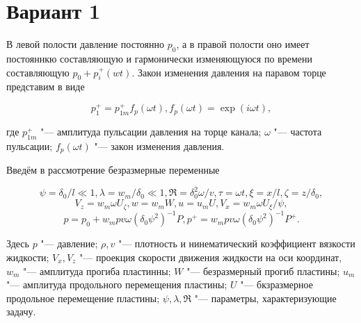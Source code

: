 \section*{Вариант 1}
    
    
    В левой полости давление постоянно $p_0$,
    а в правой полости оно имеет постояннкю составляющую и
    гармонически изменяющуюся по времени составляющую $p_0 + p_i^+(wt)$.
    Закон изменения давления на паравом торце  представим в виде

    \begin{equation}
        p_1^+ = p_{1m}^+ f_p(\omega t), f_p(\omega t) = \exp (i\omega t),
    \end{equation}

    где $p_{1m}^+$ "--- амплитуда пульсации давления на торце канала;
    $\omega$ "--- частота пульсации; $f_p(\omega t)$ "--- закон изменения давления.

    Введём в рассмотрение безразмерные переменные

    \begin{equation*}
        \psi = \delta_0 / l \ll 1,
        \lambda = w_m/\delta_0 \ll 1, 
        \Re  = \delta_0^2 \omega/v,
        \tau = \omega t, \xi = x/l,
        \zeta = z/\delta _0,
    \end{equation*}
    \begin{equation}
        V_z = w_m \omega U_\zeta,
        w = w_m W,
        u = u_m U,
        V_x = w_m\omega U_\xi /\psi,
    \end{equation}
    \begin{equation*}
        p = p_0 + w_m p v\omega(\delta_0\psi^2)^{-1}P,
        p^+ = w_m p v \omega (\delta_0 \psi^2)^{-1}P^+.
    \end{equation*}

    Здесь $p$ "--- давление; $\rho, v$ "--- плотность и нинематический коэффициент вязкости жидкости;
    $V_x, V_z$ "--- проекция скорости движения жидкости на оси координат, $w_m$ "--- амплитуда прогиба пластинны;
    $W$ "--- безразмерный прогиб пластины; $u_m$ "--- амплитуда продольного перемещения пластины;
    $U$ "--- бкзразмерное продольное перемещение пластины; $\psi, \lambda, \Re$ "--- параметры, характеризующие задачу. 